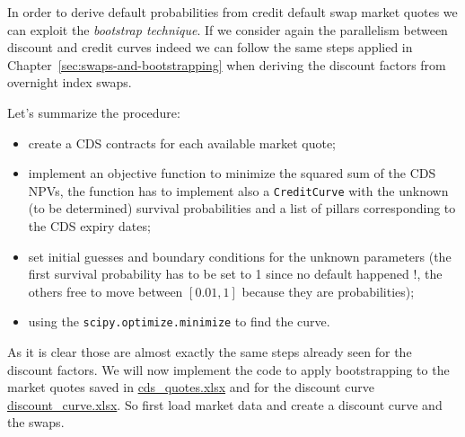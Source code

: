 In order to derive default probabilities from credit default swap market quotes we can exploit the \emph{bootstrap technique}. If we consider again the parallelism between discount and credit curves indeed we can follow the same steps applied in Chapter~\ref{sec:swaps-and-bootstrapping} when deriving the discount factors from overnight index swaps.

Let's summarize the procedure: 
\begin{itemize}
\tightlist
\item create a CDS contracts for each available market quote;
\item implement an objective function to minimize the squared sum of the CDS NPVs, the function has to implement also a \texttt{CreditCurve} with the unknown (to be determined) survival probabilities and a list of pillars corresponding to the CDS expiry dates;
\item set initial guesses and boundary conditions for the unknown parameters (the first survival probability has to be set to 1 since no default happened !, the others free to move between $[0.01, 1]$ because they are probabilities);
\item using the \texttt{scipy.optimize.minimize} to find the curve.
\end{itemize}

As it is clear those are almost exactly the same steps already seen for the discount factors. We will now implement the code to apply bootstrapping to the market quotes saved in \href{https://github.com/matteosan1/finance_course/raw/develop/libro/input_files/cds_quotes.xlsx}{cds\_quotes.xlsx} and for the discount curve \href{https://github.com/matteosan1/finance_course/blob/develop/libro/input_files/discount_curve.xlsx?raw=true}{discount\_curve.xlsx}.
So first load market data and create a discount curve and the swaps.

